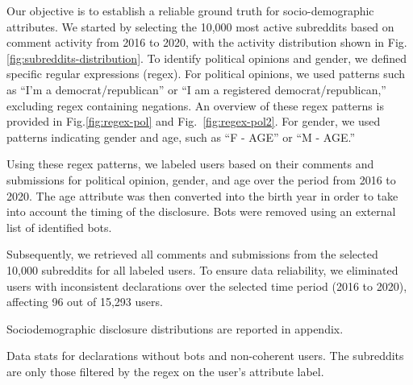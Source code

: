 Our objective is to establish a reliable ground truth for socio-demographic attributes. We started by selecting the 10,000 most active subreddits based on comment activity from 2016 to 2020, with the activity distribution shown in Fig.\ref{fig:subreddits-distribution}. To identify political opinions and gender, we defined specific regular expressions (regex). For political opinions, we used patterns such as ``I'm a democrat/republican'' or ``I am a registered democrat/republican,'' excluding regex containing negations. An overview of these regex patterns is provided in Fig.\ref{fig:regex-pol} and Fig.~\ref{fig:regex-pol2}. 
For gender, we used patterns indicating gender and age, such as ``F - AGE'' or ``M - AGE.''

Using these regex patterns, we labeled users based on their comments and submissions for political opinion, gender, and age over the period from 2016 to 2020. %
The age attribute was then converted into the birth year in order to take into account %
the timing of the disclosure. Bots were removed using an external list of identified bots.

Subsequently, we retrieved all comments and submissions from the selected 10,000 subreddits for all labeled users. To ensure data reliability, we eliminated users with inconsistent declarations over the selected time period (2016 to 2020), affecting 96 out of 15,293 users.


Sociodemographic disclosure distributions are reported in appendix.

\begin{table}[t]
\caption{Data stats for declarations without bots and non-coherent users. The subreddits are only those filtered by the regex on the user's attribute label.}
\vspace{-3mm}
\centering
\resizebox{\columnwidth}{!}{}
\label{table:stats}
\vspace{-3mm}
\end{table}


